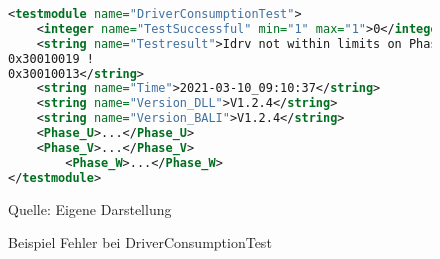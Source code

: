 \begin{figure}[H]
\centering
\begin{minipage}{0.95\textwidth}
\begin{lstlisting}[language=XML]
<testmodule name="DriverConsumptionTest">
	<integer name="TestSuccessful" min="1" max="1">0</integer>
	<string name="Testresult">Idrv not within limits on Phase U
0x30010019 !
0x30010013</string>
	<string name="Time">2021-03-10_09:10:37</string>
	<string name="Version_DLL">V1.2.4</string>
    <string name="Version_BALI">V1.2.4</string>
    <Phase_U>...</Phase_U>
    <Phase_V>...</Phase_V>
        <Phase_W>...</Phase_W>
</testmodule>
\end{lstlisting}
\end{minipage}
\caption{Beispiel Fehler bei DriverConsumptionTest}
\label{fig: Beispiel Fehler bei DriverConsumptionTest}
    {Quelle: Eigene Darstellung}
\end{figure}





